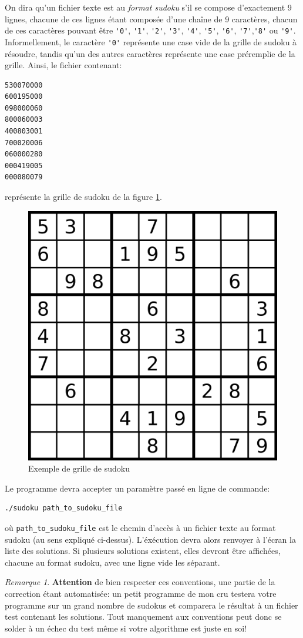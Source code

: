 \documentclass[french,a4paper]{article}
\theoremstyle{definition}
\theoremstyle{remark}
\newtheorem*{remark}{Remarque}
\newcommand{\shell}[1]{\lstinline[style={},style=sh]|#1|}
\newcommand{\inlinec}[1]{\lstinline[style=C]°#1°}
\begin{document}
\medskip

On dira qu'un fichier texte est au {\em format sudoku} s'il se compose
d'exactement 9 lignes, chacune de ces lignes étant composée d'une
chaîne de 9 caractères, chacun de ces caractères pouvant être
\inlinec{'0'}, \inlinec{'1'}, \inlinec{'2'}, \inlinec{'3'},
\inlinec{'4'}, \inlinec{'5'}, \inlinec{'6'},
\inlinec{'7'},\inlinec{'8'} ou \inlinec{'9'}. Informellement, le
caractère \inlinec{'0'} représente une case vide de la grille de
sudoku à résoudre, tandis qu'un des autres caractères représente une
case préremplie de la grille. Ainsi, le fichier contenant:
\begin{lstlisting}[style={},style=sh]
530070000 
600195000
098000060
800060003
400803001
700020006
060000280
000419005
000080079
\end{lstlisting}
représente la grille de sudoku de la figure \ref{fig:ex-sudoku}.
\begin{figure}[h!]
  \centering%
  \includegraphics[width=.5\textwidth]{ex-sudoku.png}
  \caption{Exemple de grille de sudoku}%
  \label{fig:ex-sudoku}%
\end{figure}

Le programme devra accepter un paramètre passé en ligne de commande:
\begin{lstlisting}[style={},style=sh]
./sudoku path_to_sudoku_file
\end{lstlisting}
où \shell{path_to_sudoku_file} est le chemin d'accès à un fichier
texte au format sudoku (au sens expliqué ci-dessus). L'éxécution devra
alors renvoyer à l'écran la liste des solutions. Si plusieurs
solutions existent, elles devront être affichées, chacune au format
sudoku, avec une ligne vide les séparant.

\begin{remark}
  {\bf Attention} de bien respecter ces conventions, une partie de la
  correction étant automatisée: un petit programme de mon cru testera
  votre programme sur un grand nombre de sudokus et comparera le
  résultat à un fichier test contenant les solutions. Tout manquement
  aux conventions peut donc se solder à un échec du test même si votre
  algorithme est juste en soi!
\end{remark}
\end{document}
